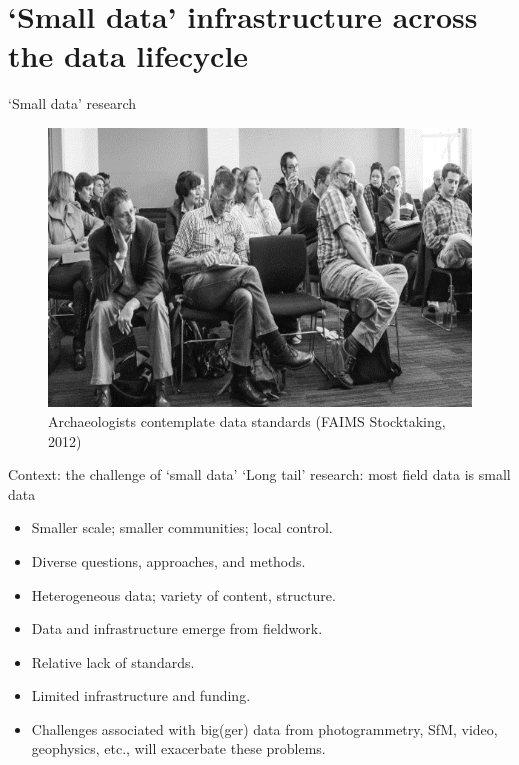 \documentclass[aspectratio=169, 11pt]{beamer} %
\begin{document}
\section{`Small data' infrastructure across the data lifecycle}

\begin{frame}{`Small data' research}
 \begin{figure}[H]
    \centering
        \includegraphics[height=.75\textheight]{figures/Archaeologists-standards.png}
        \caption{Archaeologists contemplate data standards (FAIMS Stocktaking, 2012)}
        \label{fig:figure7}
 \end{figure}
\end{frame}

\begin{frame}{Context: the challenge of `small data'}
    `Long tail' research: most field data is small data \cite{Borgman2015-rh}
    \begin{itemize}[label=\textbullet]
        \item Smaller scale; smaller communities; local control.
        \item Diverse questions, approaches, and methods.
        \item Heterogeneous data; variety of content, structure.
        \item Data and infrastructure emerge from fieldwork. 
        \item Relative lack of standards.
        \item Limited infrastructure and funding.
        \item Challenges associated with big(ger) data from photogrammetry, SfM, video, geophysics, etc., will exacerbate these problems.
    \end{itemize}
\end{frame}
\end{document}
